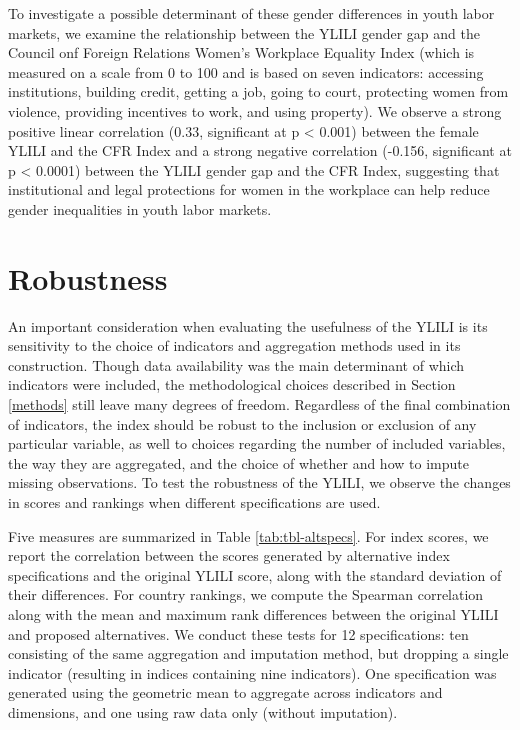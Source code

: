 \documentclass[
  a4paper, twoside, 12pt]{book}
\begin{document}
To investigate a possible determinant of these gender differences in youth labor markets, we examine the relationship between the YLILI gender gap and the Council onf Foreign Relations Women's Workplace Equality Index (which is measured on a scale from 0 to 100 and is based on seven indicators: accessing institutions, building credit, getting a job, going to court, protecting women from violence, providing incentives to work, and using property). We observe a strong positive linear correlation (0.33, significant at p \textless{} 0.001) between the female YLILI and the CFR Index and a strong negative correlation (-0.156, significant at p \textless{} 0.0001) between the YLILI gender gap and the CFR Index, suggesting that institutional and legal protections for women in the workplace can help reduce gender inequalities in youth labor markets.

\hypertarget{robustness}{%
\section{Robustness}\label{robustness}}

An important consideration when evaluating the usefulness of the YLILI is its sensitivity to the choice of indicators and aggregation methods used in its construction. Though data availability was the main determinant of which indicators were included, the methodological choices described in Section \ref{methods} still leave many degrees of freedom. Regardless of the final combination of indicators, the index should be robust to the inclusion or exclusion of any particular variable, as well to choices regarding the number of included variables, the way they are aggregated, and the choice of whether and how to impute missing observations. To test the robustness of the YLILI, we observe the changes in scores and rankings when different specifications are used.

Five measures are summarized in Table \ref{tab:tbl-altspecs}. For index scores, we report the correlation between the scores generated by alternative index specifications and the original YLILI score, along with the standard deviation of their differences. For country rankings, we compute the Spearman correlation along with the mean and maximum rank differences between the original YLILI and proposed alternatives. We conduct these tests for 12 specifications: ten consisting of the same aggregation and imputation method, but dropping a single indicator (resulting in indices containing nine indicators). One specification was generated using the geometric mean to aggregate across indicators and dimensions, and one using raw data only (without imputation).
\end{document}
